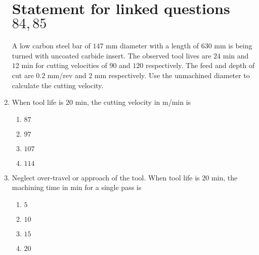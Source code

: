 \documentclass[journal,12pt,twocolumn]{IEEEtran}
\theoremstyle{remark}
\begin{document}
\begin{enumerate}[start=69]
                            \section{Statement for linked questions$84 , 85$}
			 A low carbon steel bar of $147$ mm diameter with a length of $630$ mm is being turned with uncoated carbide insert. The observed tool lives are $24$ min and $12$ min for cutting velocities of $90$  and $120$  respectively. The feed and depth of cut are $0.2$ mm/rev and $2$ mm respectively. Use the unmachined diameter to calculate the cutting velocity.
                         \item When tool life is $20$ min, the cutting velocity in m/min is
                            \begin{enumerate}
                               \item  $87$ 
                               \item  $97$ 
                                \item $107$ 
                                \item $114$
                            \end{enumerate}
                        
                            \item Neglect over-travel or approach of the tool. When tool life is $20$ min, the machining time in min for a single pass is
                            \begin{enumerate}
                               \item  $5$
                                \item $10$ 
                                \item $15$ 
                                \item $20$
                            \end{enumerate}
                        \end{enumerate}
                        
\end{document}
